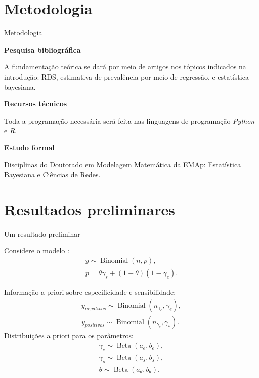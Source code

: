 \documentclass{beamer}
\newcommand{\Space}{\vspace{3ex}}
\begin{document}


\section{Metodologia}


\begin{frame}{Metodologia}

{\bf Pesquisa bibliográfica}

A fundamentação teórica se dará por meio de artigos nos tópicos indicados na
introdução: RDS, estimativa de prevalência por meio de
regressão, e estatística bayesiana. 

\Space

{\bf Recursos técnicos}

Toda a programação necessária será feita nas linguagens de programação \textit{Python} e \textit{R}. 

\Space

{\bf Estudo formal}

Disciplinas do Doutorado em Modelagem Matemática da EMAp: Estatística Bayesiana e Ciências de Redes.

\end{frame}


\section{Resultados preliminares}


\begin{frame}{Um resultado preliminar}

  Considere o modelo \cite{gelman2020bayesian}:
  \begin{gather*}
    y \sim \operatorname{Binomial}(n, p), \\
    p = \theta\gamma_s + (1- \theta)(1-\gamma_e).
  \end{gather*}

  Informação a priori sobre especificidade e sensibilidade:
  \begin{gather*}
    y_{negativos} \sim \operatorname{Binomial}(n_{\gamma_e}, \gamma_e), \\
    y_{positivos} \sim \operatorname{Binomial}(n_{\gamma_s}, \gamma_s).
  \end{gather*}
  Distribuições a priori para os parâmetros: 
  \begin{gather*}
    \gamma_e \sim \operatorname{Beta}(a_e, b_e), \\
    \gamma_s \sim \operatorname{Beta}(a_s, b_s), \\
    \theta \sim \operatorname{Beta}(a_{\theta}, b_{\theta}).
  \end{gather*}  

\end{frame}
\end{document}
